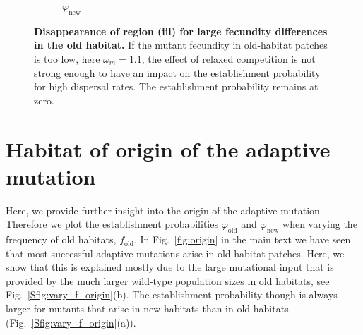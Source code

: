 \documentclass[a4paper,11pt]{scrartcl}
\newcommand{\chg}[1]{\textcolor{change}{#1}}
\begin{document}
\begin{figure}
\begin{subfigure}{.5\textwidth}
  	\caption{$\varphi_{\text{new}}$}
	\end{subfigure}
	\caption{\textbf{Disappearance of region (iii) for large fecundity differences in the old habitat.} If the mutant fecundity in old-habitat patches is too low, here $\omega_m=1.1$, the effect of relaxed competition is not strong enough to have an impact on the establishment probability for high dispersal rates. The establishment probability remains at zero.}
	\label{Sfig:weak_fecundity}
\end{figure}


\newpage
\section{Habitat of origin of the adaptive mutation}
\chg{Here, we provide further insight into the origin of the adaptive mutation. Therefore we plot the establishment probabilities $\varphi_{\text{old}}$ and $\varphi_{\text{new}}$ when varying the frequency of old habitats, $f_{\text{old}}$. In Fig.~\ref{fig:origin} in the main text we have seen that most successful adaptive mutations arise in old-habitat patches. Here, we show that this is explained mostly due to the large mutational input that is provided by the much larger wild-type population sizes in old habitats, see Fig.~\ref{Sfig:vary_f_origin}(b). The establishment probability though is always larger for mutants that arise in new habitats than in old habitats (Fig.~\ref{Sfig:vary_f_origin}(a)). 
}
\end{document}
